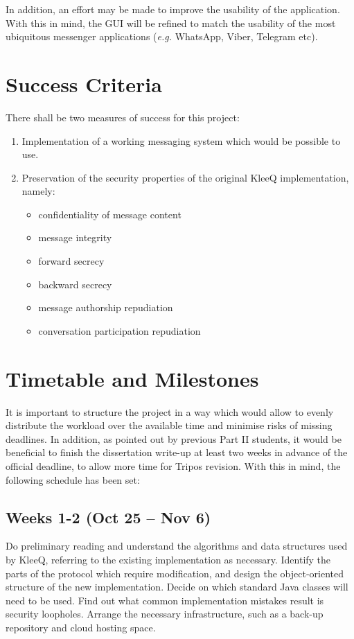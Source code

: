 \documentclass[a4paper, twoside, 12pt]{report}
\begin{document}
\begin{appendices}
\vspace{\baselineskip}
\noindent
In addition, an effort may be made to improve the usability of the application. With this in mind, the GUI will be refined to match the usability of the most ubiquitous messenger applications (\textit{e.g.} WhatsApp, Viber, Telegram etc).




\section{Success Criteria}
There shall be two measures of success for this project:
\begin{enumerate}
    \item Implementation of a working messaging system which would be possible to use.
    \item Preservation of the security properties of the original KleeQ implementation, namely:
        \begin{itemize}
            \item confidentiality of message content
            \item message integrity
            \item forward secrecy
            \item backward secrecy
            \item message authorship repudiation
            \item conversation participation repudiation
        \end{itemize}
\end{enumerate}




\section{Timetable and Milestones}
It is important to structure the project in a way which would allow to evenly distribute the workload over the available time and minimise risks of missing deadlines. In addition, as pointed out by previous Part II students, it would be beneficial to finish the dissertation write-up at least two weeks in advance of the official deadline, to allow more time for Tripos revision. With this in mind, the following schedule has been set:


\subsection*{Weeks 1-2 (Oct 25 -- Nov 6)}
Do preliminary reading and understand the algorithms and data structures used by KleeQ, referring to the existing implementation as necessary. Identify the parts of the protocol which require modification, and design the object-oriented structure of the new implementation. Decide on which standard Java classes will need to be used. Find out what common implementation mistakes result is security loopholes. Arrange the necessary infrastructure, such as a back-up repository and cloud hosting space.


\end{appendices}
\end{document}
